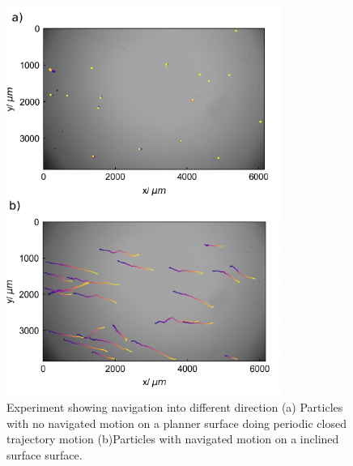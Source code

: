  \begin{figure}[p]
\centering
\includegraphics[width=9cm]{figures/5_6.pdf}
\caption{ Experiment showing navigation into different direction (a) Particles with no navigated motion on a planner surface doing periodic closed trajectory motion  (b)Particles with navigated motion on a inclined surface  surface. }
\label{fig:1}
\end{figure}
